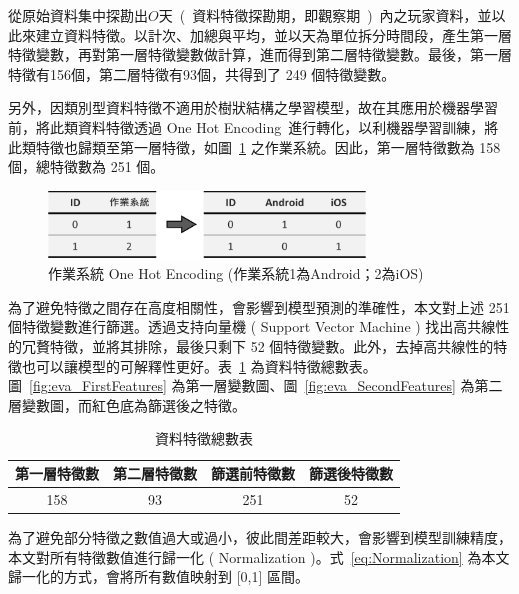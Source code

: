 從原始資料集中探勘出$O$天\ (\ 資料特徵探勘期，即觀察期\ )\ 內之玩家資料，並以此來建立資料特徵。以計次、加總與平均，並以天為單位拆分時間段，產生第一層特徵變數，再對第一層特徵變數做計算，進而得到第二層特徵變數。最後，第一層特徵有156個，第二層特徵有93個，共得到了 249 個特徵變數。

另外，因類別型資料特徵不適用於樹狀結構之學習模型，故在其應用於機器學習前，將此類資料特徵透過 One Hot Encoding~\cite{wiki:OneHotEncoding}進行轉化，以利機器學習訓練，將此類特徵也歸類至第一層特徵，如圖~\ref{fig:eva_OneHotEncoder} 之作業系統。因此，第一層特徵數為 158 個，總特徵數為 251 個。

\begin{figure}[!htb]
    \begin{center}
      \includegraphics[width=0.75\textwidth]{figures/evaluation/Image_OneHotEncoder.png}
      \caption[作業系統 One Hot Encoding]{作業系統 One Hot Encoding (作業系統1為Android；2為iOS)}
      \label{fig:eva_OneHotEncoder}
    \end{center}
\end{figure}

為了避免特徵之間存在高度相關性，會影響到模型預測的準確性，本文對上述 251 個特徵變數進行篩選。透過支持向量機 ( Support Vector Machine ) 找出高共線性的冗贅特徵，並將其排除，最後只剩下 52 個特徵變數。此外，去掉高共線性的特徵也可以讓模型的可解釋性更好。表~\ref{tab:NumberOfFeatures} 為資料特徵總數表。圖~\ref{fig:eva_FirstFeatures} 為第一層變數圖、圖~\ref{fig:eva_SecondFeatures} 為第二層變數圖，而紅色底為篩選後之特徵。

\begin{table}[!htb]
	\centering
	\begin{tabular}{cccc}
	\hline \hline
	第一層特徵數 & 第二層特徵數 & 篩選前特徵數 & 篩選後特徵數 \\
    \hline \hline
    158 & 93 & 251 & 52 \\
    \hline \hline
	\end{tabular}
	\caption[資料特徵總數表]{資料特徵總數表}
	\label{tab:NumberOfFeatures}
\end{table}

為了避免部分特徵之數值過大或過小，彼此間差距較大，會影響到模型訓練精度，本文對所有特徵數值進行歸一化 ( Normalization )。式~\ref{eq:Normalization} 為本文歸一化的方式，會將所有數值映射到 [0,1] 區間。


